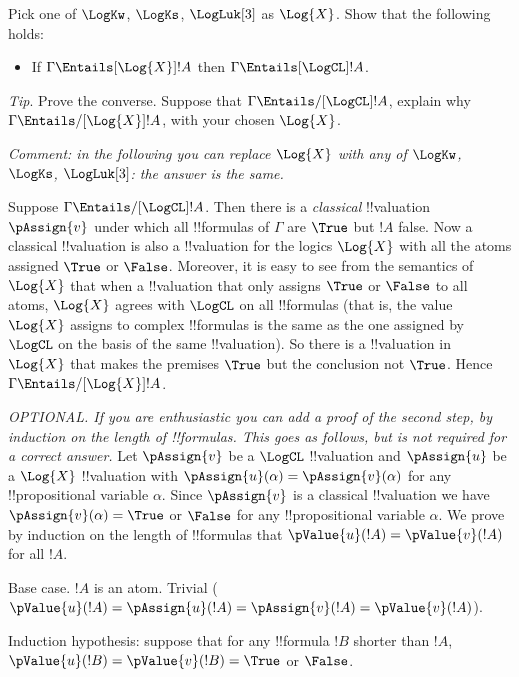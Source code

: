 \documentclass[../../../../include/open-logic-section]{subfiles}
\begin{document}
\begin{prob}
Pick one of $\LogKw$, $\LogKs$, $\LogLuk[3]$ as $\Log{X}$. 
Show that the following holds: 
\begin{itemize}
	\item If $\Gamma \Entails[\Log{X}] !A$ then  $\Gamma \Entails[\LogCL] !A$.
\end{itemize}
\emph{Tip}. Prove the converse. Suppose that $\Gamma \Entails/[\LogCL] !A$, 
explain why $\Gamma \Entails/[\Log{X}] !A$, with your chosen $\Log{X}$.
\begin{ans}
\emph{Comment: in the following you can replace $\Log{X}$ with any of
$\LogKw$, $\LogKs$, $\LogLuk[3]$: the answer is the same.}

Suppose $\Gamma \Entails/[\LogCL] !A$. Then there is a \emph{classical} 
!!{valuation} $\pAssign{v}$ under which all !!{formula}s of $\Gamma$ are 
$\True$ but $!A$ false. Now a classical !!{valuation} is also a !!{valuation}
for the logics $\Log{X}$ with all the atoms assigned $\True$ or $\False$. 
Moreover, it is easy to see from the semantics of $\Log{X}$ that when a
!!{valuation} that only assigns $\True$ or $\False$ to all atoms, $\Log{X}$
agrees with $\LogCL$ on all !!{formula}s (that is, the value $\Log{X}$ assigns
to complex !!{formula}s is the same as the one assigned by $\LogCL$
on the basis of the same !!{valuation}). So there is a !!{valuation}
in $\Log{X}$ that makes the premises $\True$ but the conclusion not $\True$.
Hence $\Gamma \Entails/[\Log{X}] !A$. 

\emph{OPTIONAL. If you are enthusiastic you can add a proof of the second
step, by induction on the length of !!{formula}s. This goes as follows, but
is not required for a correct answer.} Let $\pAssign{v}$ be a $\LogCL$ 
!!{valuation} and $\pAssign{u}$ be a $\Log{X}$ !!{valuation} with
$\pAssign{u}(\alpha)=\pAssign{v}(\alpha)$ for any !!{propositional variable}
$\alpha$. Since $\pAssign{v}$ is a classical !!{valuation} we have 
$\pAssign{v}(\alpha)=\True$ or $\False$ for any !!{propositional variable} $\alpha$.
We prove by induction on the length of !!{formula}s that $\pValue{u}(!A)
=\pValue{v}(!A)$ for all $!A$.

Base case. $!A$ is an atom. Trivial ($\pValue{u}(!A) = \pAssign{u}(!A)
=\pAssign{v}(!A) = \pValue{v}(!A)$).

Induction hypothesis: suppose that for any !!{formula} $!B$ shorter than $!A$,
$\pValue{u}(!B) = \pValue{v}(!B) = \True$ or $\False$.


\end{ans}
\end{prob}
\end{document}
